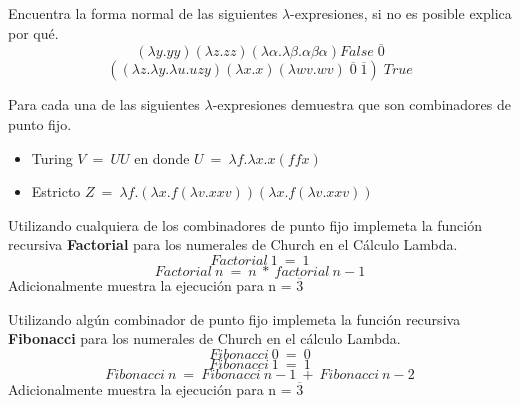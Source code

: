                 \begin{exercise}
                    Encuentra la forma normal de las siguientes $\lambda$-expresiones, si no es posible explica por qué.\\
                    \[
                        (\lambda y.yy)(\lambda z.zz)(\lambda \alpha . \lambda \beta . \alpha \beta \alpha) False \; \overline{0}
                    \]
                    \[
                        ((\lambda z. \lambda y. \lambda u.uzy)(\lambda x.x)(\lambda wv.wv) \; \overline{0} \; \overline{1}) \; True 
                    \]
                \end{exercise}

                \begin{exercise}
                    Para cada una de las siguientes $\lambda$-expresiones demuestra que son combinadores de punto fijo.\\
                    
                    \begin{itemize}
                        \item Turing $V\ =\ UU$ en donde $U\ =\ \lambda f.\lambda x.x(ffx)$
                        \item Estricto $Z\ =\ \lambda f.(\lambda x.f(\lambda v.xxv))(\lambda x.f(\lambda v.xxv))$
                    \end{itemize}
                    
                \end{exercise}

                \begin{exercise}
                    Utilizando cualquiera de los combinadores de punto fijo implemeta la función recursiva \textbf{Factorial} para los numerales de Church en el Cálculo Lambda.
                    \[ Factorial\ 1\ =\ 1 \]
                    \[ Factorial\ n\ =\ n\ *\ factorial\ n-1\]
                    Adicionalmente muestra la ejecución para n = $\overline{3}$
                \end{exercise}

                \begin{exercise}
                    Utilizando algún combinador de punto fijo implemeta la función recursiva \textbf{Fibonacci} para los numerales de Church en el cálculo Lambda.
                    \[ Fibonacci\ 0\ =\ 0 \]
                    \[ Fibonacci\ 1\ =\ 1 \]
                    \[ Fibonacci\ n\ =\ Fibonacci\ n-1\ +\ Fibonacci\ n-2\]
                    Adicionalmente muestra la ejecución para n = $\overline{3}$
                \end{exercise}

